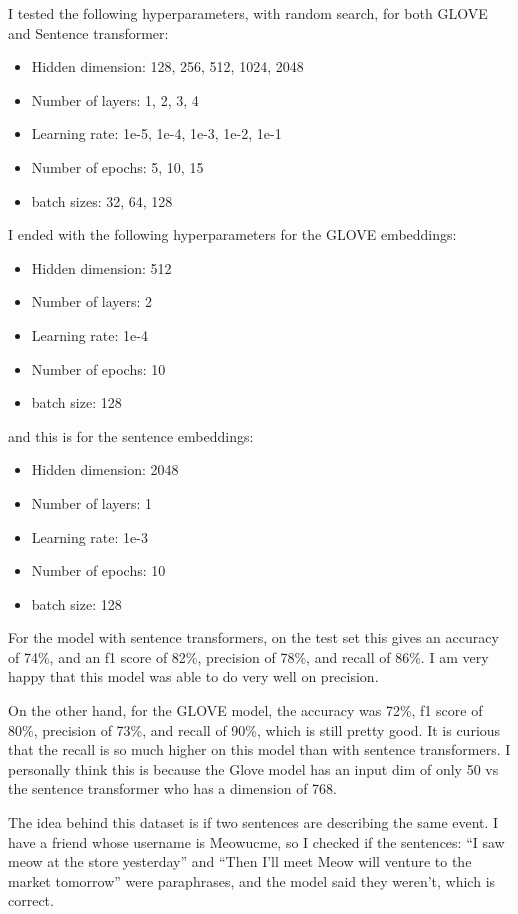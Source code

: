\documentclass[12pt]{article}
\theoremstyle{definitionstyle}
\begin{document}
\begin{enumerate}
        I tested the following hyperparameters, with random search, for both GLOVE and Sentence transformer:
        \begin{itemize}
            \item Hidden dimension: 128, 256, 512, 1024, 2048
            \item Number of layers: 1, 2, 3, 4
            \item Learning rate: 1e-5, 1e-4, 1e-3, 1e-2, 1e-1
            \item Number of epochs: 5, 10, 15
            \item batch sizes: 32, 64, 128
        \end{itemize}
        I ended with the following hyperparameters for the GLOVE embeddings:
        \begin{itemize}
            \item Hidden dimension: 512
            \item Number of layers: 2
            \item Learning rate: 1e-4
            \item Number of epochs: 10
            \item batch size: 128
        \end{itemize}
        and this is for the sentence embeddings:
        \begin{itemize}
            \item Hidden dimension: 2048
            \item Number of layers: 1
            \item Learning rate: 1e-3
            \item Number of epochs: 10
            \item batch size: 128
        \end{itemize}
        For the model with sentence transformers, on the test set this gives an accuracy of 74\%, and an f1 score of 82\%, precision of 78\%, and recall of 86\%. I am very happy that this model was able to do very well on precision. 

        On the other hand, for the GLOVE model, the accuracy was 72\%, f1 score of 80\%, precision of 73\%, and recall of 90\%, which is still pretty good. It is curious that the recall is so much higher on this model than with sentence transformers. I personally think this is because the Glove model has an input dim of only 50 vs the sentence transformer who has a dimension of 768. 

        The idea behind this dataset is if two sentences are describing the same event. I have a friend whose username is Meowucme, so I checked if the sentences: ``I saw meow at the store yesterday'' and ``Then I'll meet Meow will venture to the market tomorrow'' were paraphrases, and the model said they weren't, which is correct. 
    \end{enumerate}
\end{document}
